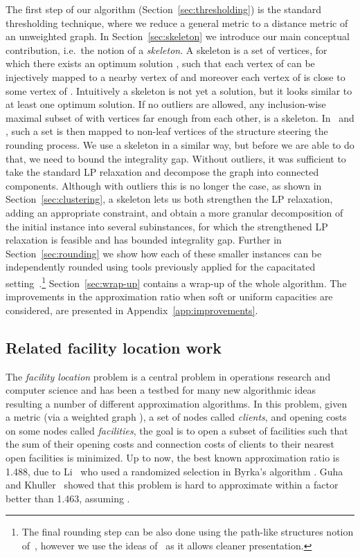 \documentclass{article}
\theoremstyle{plain}
\theoremstyle{definition}
\begin{document}
The first step of our algorithm (Section~\ref{sec:thresholding}) is the standard
thresholding technique, where we reduce a general metric to a distance metric of an unweighted graph.
In Section~\ref{sec:skeleton} we introduce our main conceptual
contribution, i.e.\ the notion of a {\em skeleton}.
A skeleton is a set  of vertices, for which
there exists an optimum solution , 
such that each vertex of  can be injectively mapped to a
nearby vertex of  and moreover each vertex of 
is close to some vertex of .
Intuitively a skeleton is not yet a solution, but it looks
similar to at least one optimum solution.
If no outliers are allowed, any inclusion-wise maximal subset of  with vertices
far enough from each other, is a skeleton.  In~\cite{chk-focs12} and \cite{svensson},
such a set is then mapped to non-leaf vertices of the structure steering the rounding process.
We use a skeleton in a similar way, but before we are able to do that,
we need to bound the integrality gap. Without outliers, it was sufficient to take the
 standard LP relaxation and decompose the graph into connected components. 
Although with outliers this is no longer the case,
as shown in Section~\ref{sec:clustering}, a skeleton lets us both strengthen the LP relaxation, adding an appropriate constraint,
and obtain a more granular decomposition of the initial instance into several
subinstances, for which the strengthened LP relaxation is feasible and has bounded integrality gap.
Further in Section~\ref{sec:rounding} we show how each of these
smaller instances can be independently rounded using tools previously applied for the capacitated setting~\cite{svensson}.\footnote{The final
rounding step can be also done using the path-like structures notion of~\cite{chk-focs12},
however we use the ideas of~\cite{svensson} as it allows cleaner presentation.}
Section~\ref{sec:wrap-up} contains a wrap-up of the whole algorithm.
The improvements in the approximation ratio when soft or uniform capacities are considered, are presented in Appendix~\ref{app:improvements}. 

\subsection{Related facility location work}

The {\em facility location} problem is a central problem in operations
research and computer science and has been a testbed for many new
algorithmic ideas resulting a number of different
approximation algorithms. In this problem,  given a metric (via a weighted graph ), a set of nodes called {\em clients},  and opening costs on some nodes called {\em facilities}, the goal is to open a subset of facilities such that the sum of their opening costs and connection costs of clients to their nearest open facilities is minimized. 
Up to now, the best known approximation ratio is 1.488, due to Li~\cite{Li11}
who used a randomized selection in Byrka's algorithm \cite{Byr07}.  Guha and Khuller~\cite{GK} showed that this problem is hard to approximate within a factor better than 1.463, assuming .
\end{document}
